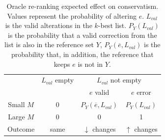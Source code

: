 \documentclass[a4paper, 11pt]{article}
\begin{document}
\begin{table}[t]
	\vspace{-0.5cm}
	\centering
	\small
	\singlespacing
	\begin{tabular}{c|c|cc}
		& $L_{val}$ empty & \multicolumn{2}{c}{$L_{val}$ not empty} \\
		&            & $e$ valid & $e$ error \\ \hline
		\multicolumn{1}{c|}{Small $M$} & 0 & $P_Y(\overline{e}, L_{val})$ & $P_Y\left(L_{val}\right)$    \\
		\multicolumn{1}{c|}{Large $M$} & 0 & 0              & 1                  \\ \hline
		\multicolumn{1}{c|}{Outcome}            & same  & $\downarrow$ changes        & $\uparrow$ changes
	\end{tabular}
	\caption{\label{ta:oracle_expected_results}
		Oracle re-ranking expected effect on conservatism.
		Values represent the probability of altering $e$. $L_{val}$ is the valid alterations in the $k$-best list. $P_Y\left(L_{val}\right)$ is the probability that a valid correction from the list is also in the reference set $Y$,
		$P_Y(\overline{e}, L_{val})$ is the probability that, in addition, the reference that keeps $e$ is not in $Y$.
		\vspace{-0.5cm}
	}
	
	
\end{table}
%
\end{document}
